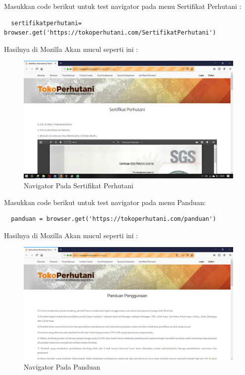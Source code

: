 Masukkan code berikut untuk test navigator pada menu Sertifikat Perhutani :

\begin{verbatim}
  sertifikatperhutani= browser.get('https://tokoperhutani.com/SertifikatPerhutani')
\end{verbatim}

Hasilnya  di Mozilla Akan mucul seperti ini :
\begin{figure}[h]
\centering
\includegraphics[scale=0.3]{figures/3}
\caption{Navigator Pada Sertifikat Perhutani}
\end{figure}

Masukkan code berikut untuk test navigator pada menu  Panduan:
\begin{verbatim}
  panduan = browser.get('https://tokoperhutani.com/panduan')
\end{verbatim}

Hasilnya  di Mozilla Akan mucul seperti ini :
\begin{figure}[h]
\centering
\includegraphics[scale=0.3]{figures/1hasil.PNG}
\caption{Navigator Pada Panduan}
\end{figure}

